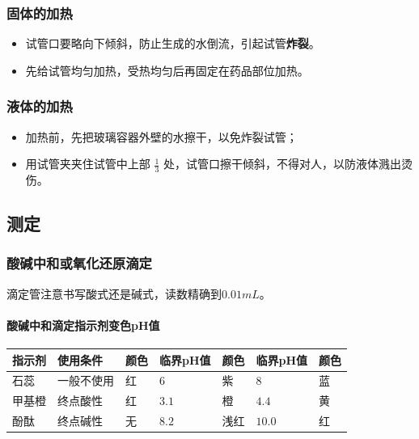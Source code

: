 \documentclass[10pt]{article}
\begin{document}
	\subsubsection{固体的加热}
	
	\begin{itemize}
		\item 试管口要略向下倾斜，防止生成的水倒流，引起试管\textbf{炸裂}。
		\item 先给试管均匀加热，受热均匀后再固定在药品部位加热。
	\end{itemize}
	
	\subsubsection{液体的加热}
	
	\begin{itemize}
		\item 加热前，先把玻璃容器外壁的水擦干，以免炸裂试管；
		\item 用试管夹夹住试管中上部 $\frac 13$ 处，试管口擦干倾斜，不得对人，以防液体溅出烫伤。
	\end{itemize}
	
	
	\subsection{测定}
	
	\subsubsection{酸碱中和或氧化还原滴定}
	
	滴定管注意书写酸式还是碱式，读数精确到$0.01mL$。
	
	\paragraph{酸碱中和滴定指示剂变色pH值}
	
	\begin{center}
	\begin{tabular}{|m{2cm}<{ \centering}|m{2cm}<{ \centering}|m{1.5cm}<{ \centering}|m{2cm}<{ \centering}|m{1.5cm}<{ \centering}|m{2cm}<{ \centering}|m{1.5cm}<{ \centering}|}
		\hline
		\textbf{指示剂}  & \textbf{使用条件} & \textbf{颜色} & \textbf{临界pH值} & \textbf{颜色} & \textbf{临界pH值} & \textbf{颜色} \\ \hline
		石蕊 & 一般不使用 & 红 & $6$ & 紫 & $8$ & 蓝\\\hline
		甲基橙 & 终点酸性 & 红 & $3.1$ & 橙 & $4.4$ & 黄\\\hline
		酚酞 & 终点碱性 & 无 & $8.2$ & 浅红 & $10.0$ & 红\\\hline
	\end{tabular}
	\end{center}
	
\end{document}
